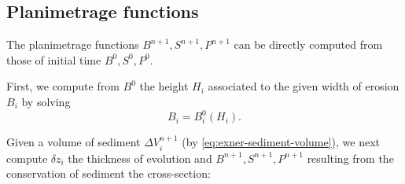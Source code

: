 \subsection{Planimetrage functions}
The planimetrage functions $B^{n+1}, S^{n+1}, P^{n+1}$ can be directly computed from those of initial time $B^0, S^0, P^0$.

First, we compute from $B^0$ the height $H_i$ associated to the given width of erosion $B_i$ by solving
\begin{equation}\label{eq:height-of-erosion}
  B_i=B_i^0(H_i).
\end{equation}

Given a volume of sediment $\Delta V_i^{n+1}$ (by \eqref{eq:exner-sediment-volume}), we next compute $\delta z_i$ the thickness of evolution and $B^{n+1}, S^{n+1}, P^{n+1}$ resulting from the conservation of sediment the cross-section:
